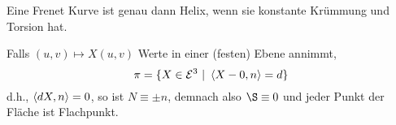 \begin{theorem}
	Eine Frenet Kurve ist genau dann Helix, wenn sie konstante Krümmung und Torsion hat.
\end{theorem}

\begin{example}
	
	Falls $  (u,v) \mapsto X(u,v) $ Werte in einer (festen) Ebene annimmt,
	\[ \pi = \{ X \in \mathcal E^3 ~|~ \left \langle X-0,n \right\rangle = d \} \] d.h., $ \left \langle dX,n \right\rangle=0 $, so ist $ N \equiv \pm n $, demnach also $\S \equiv 0$ und jeder Punkt der Fläche ist Flachpunkt. 
	
\end{example}


